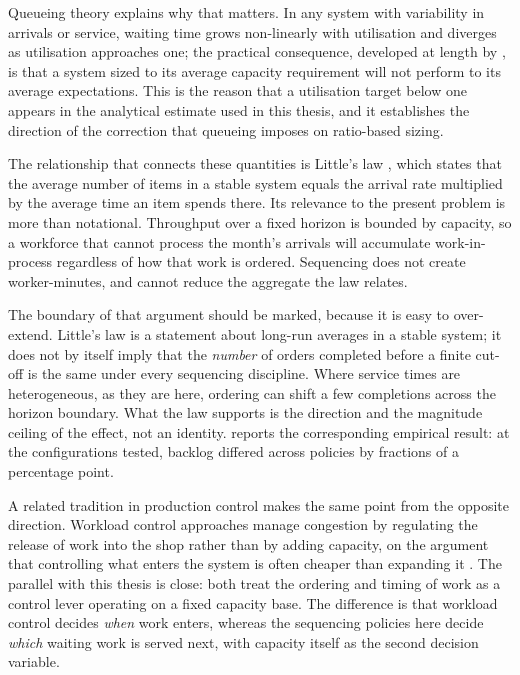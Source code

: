 Queueing theory explains why that matters. In any system with variability in arrivals or
service, waiting time grows non-linearly with utilisation and diverges as utilisation approaches
one; the practical consequence, developed at length by \citet{hopp2011}, is that a system sized
to its average capacity requirement will not perform to its average expectations. This is the
reason that a utilisation target below one appears in the analytical estimate used in this
thesis, and it establishes the direction of the correction that queueing imposes on ratio-based
sizing.

The relationship that connects these quantities is Little's law \citep{little1961}, which
states that the average number of items in a stable system equals the arrival rate multiplied by
the average time an item spends there. Its relevance to the present problem is more than
notational. Throughput over a fixed horizon is bounded by capacity, so a workforce that cannot
process the month's arrivals will accumulate work-in-process regardless of how that work is
ordered. Sequencing does not create worker-minutes, and cannot reduce the aggregate the law
relates.

The boundary of that argument should be marked, because it is easy to over-extend. Little's law
is a statement about long-run averages in a stable system; it does not by itself imply that the
\emph{number} of orders completed before a finite cut-off is the same under every sequencing
discipline. Where service times are heterogeneous, as they are here, ordering can shift a few
completions across the horizon boundary. What the law supports is the direction and the
magnitude ceiling of the effect, not an identity.  reports the
corresponding empirical result: at the configurations tested, backlog differed across policies
by fractions of a percentage point.

A related tradition in production control makes the same point from the opposite direction.
Workload control approaches manage congestion by regulating the release of work into the shop
rather than by adding capacity, on the argument that controlling what enters the system is often
cheaper than expanding it \citep{thurer2012}. The parallel with this thesis is close: both treat
the ordering and timing of work as a control lever operating on a fixed capacity base. The
difference is that workload control decides \emph{when} work enters, whereas the sequencing
policies here decide \emph{which} waiting work is served next, with capacity itself as the
second decision variable.

